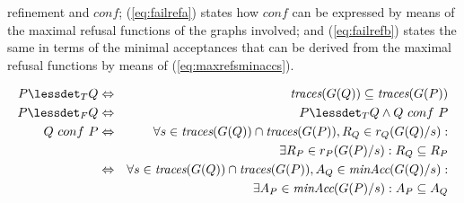 refinement and $conf$; (\ref{eq:failrefa}) states how $conf$ can be expressed
by means of the maximal refusal functions of the graphs involved; and
(\ref{eq:failrefb}) states the same in terms of the minimal acceptances that
can be derived from the maximal refusal functions by means of
(\ref{eq:maxrefsminaccs}).
%
\begin{lemma}
  \label{lemma:tgtrcref}
  \begin{eqnarray}
  P \lessdet_T Q & \Leftrightarrow & \trc(G(Q)) \subseteq\trc(G(P))
  \label{eq:trcrefa}
  \\
  \label{eq:failconf}
  P \lessdet_F Q & \Leftrightarrow & P \lessdet_T Q \wedge Q\ conf\ P
  \\
  \label{eq:failrefa}
  Q\ conf\ P & \Leftrightarrow & \nonumber
  \forall s\in\trc(G(Q))\cap \trc(G(P)), R_Q\in r_Q(G(Q)/s):  \nonumber
  \\ & & \tabd
  \exists R_P\in r_P(G(P)/s): R_Q\subseteq R_P
  \\
  \label{eq:failrefb}
   & \Leftrightarrow &
    \forall s\in\trc(G(Q))\cap \trc(G(P)), A_Q\in\minaccs(G(Q)/s):  \nonumber
   \\ & & \tabd
  \exists A_P\in\minaccs(G(P)/s): A_P\subseteq A_Q
 \end{eqnarray}
  \xbox
\end{lemma}
%
